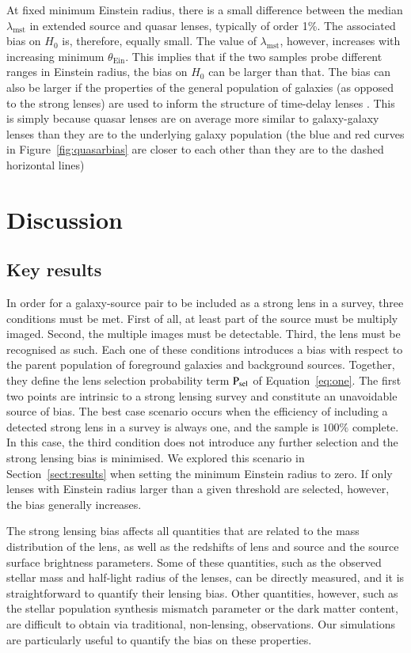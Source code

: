 \documentclass{aa}
\def\tein{\theta_{\mathrm{Ein}}}
\def\psel{{\rm P}_\mathrm{sel}}
\def\lmst{\lambda_{\mathrm{mst}}}
\def\Sref#1{Section~\ref{#1}\xspace}
\def\Fref#1{Figure~\ref{#1}\xspace}
\def\Eref#1{Equation~\ref{#1}\xspace}
\begin{document}
{At fixed minimum Einstein radius, there is a small difference between the median $\lmst$ in extended source and quasar lenses, typically of order 1\%.
The associated bias on $H_0$ is, therefore, equally small.
The value of $\lmst$, however, increases with increasing minimum $\tein$. This implies that if the two samples probe different ranges in Einstein radius, the bias on $H_0$ can be larger than that.
The bias can also be larger if the properties of the general population of galaxies (as opposed to the strong lenses) are used to inform the structure of time-delay lenses \citep[see][]{C+C16}. This is simply because quasar lenses are on average more similar to galaxy-galaxy lenses than they are to the underlying galaxy population (the blue and red curves in \Fref{fig:quasarbias} are closer to each other than they are to the dashed horizontal lines)
}


\section{Discussion}\label{sect:discuss}

\subsection{Key results}

In order for a galaxy-source pair to be included as a strong lens in a survey, three conditions must be met.
First of all, at least part of the source must be multiply imaged.
Second, the multiple images must be detectable.
Third, the lens must be recognised as such.
Each one of these conditions introduces a bias with respect to the parent population of foreground galaxies and background sources. Together, they define the lens selection probability term $\psel$ of \Eref{eq:one}.
The first two points are intrinsic to a strong lensing survey and constitute an unavoidable source of bias. 
The best case scenario occurs when the efficiency of including a detected strong lens in a survey is always one, and the sample is $100\%$ complete. In this case, the third condition does not introduce any further selection and the strong lensing bias is minimised.
We explored this scenario in \Sref{sect:results} when setting the minimum Einstein radius to zero.
If only lenses with Einstein radius larger than a given threshold are selected, however, the bias generally increases.

The strong lensing bias affects all quantities that are related to the mass distribution of the lens, as well as the redshifts of lens and source and the source surface brightness parameters.
Some of these quantities, such as the observed stellar mass and half-light radius of the lenses, can be directly measured, and it is straightforward to quantify their lensing bias.
Other quantities, however, such as the stellar population synthesis mismatch parameter or the dark matter content, are difficult to obtain via traditional, non-lensing, observations. Our simulations are particularly useful to quantify the bias on these properties.
\end{document}
